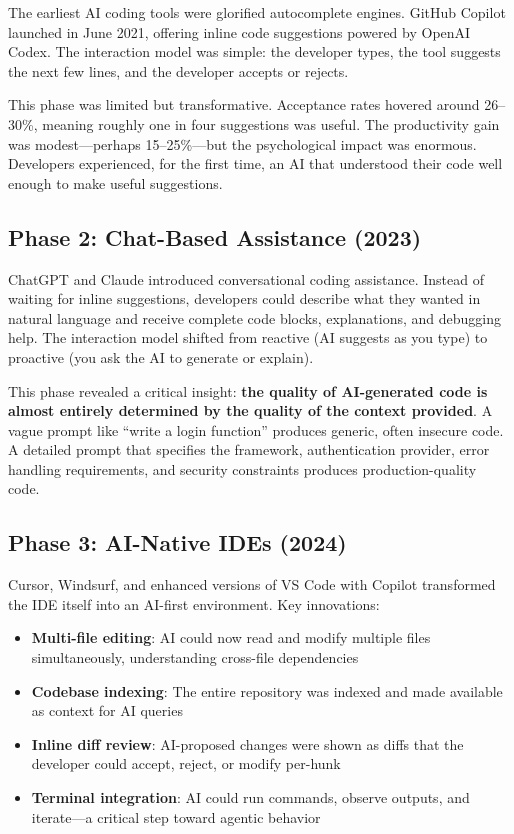 The earliest AI coding tools were glorified autocomplete engines. GitHub Copilot launched in June 2021, offering inline code suggestions powered by OpenAI Codex. The interaction model was simple: the developer types, the tool suggests the next few lines, and the developer accepts or rejects.

This phase was limited but transformative. Acceptance rates hovered around 26--30\%, meaning roughly one in four suggestions was useful. The productivity gain was modest---perhaps 15--25\%---but the psychological impact was enormous. Developers experienced, for the first time, an AI that understood their code well enough to make useful suggestions.

\subsection{Phase 2: Chat-Based Assistance (2023)}

ChatGPT and Claude introduced conversational coding assistance. Instead of waiting for inline suggestions, developers could describe what they wanted in natural language and receive complete code blocks, explanations, and debugging help. The interaction model shifted from reactive (AI suggests as you type) to proactive (you ask the AI to generate or explain).

This phase revealed a critical insight: \textbf{the quality of AI-generated code is almost entirely determined by the quality of the context provided}. A vague prompt like ``write a login function'' produces generic, often insecure code. A detailed prompt that specifies the framework, authentication provider, error handling requirements, and security constraints produces production-quality code.

\subsection{Phase 3: AI-Native IDEs (2024)}

Cursor, Windsurf, and enhanced versions of VS Code with Copilot transformed the IDE itself into an AI-first environment. Key innovations:

\begin{itemize}[leftmargin=*]
    \item \textbf{Multi-file editing}: AI could now read and modify multiple files simultaneously, understanding cross-file dependencies
    \item \textbf{Codebase indexing}: The entire repository was indexed and made available as context for AI queries
    \item \textbf{Inline diff review}: AI-proposed changes were shown as diffs that the developer could accept, reject, or modify per-hunk
    \item \textbf{Terminal integration}: AI could run commands, observe outputs, and iterate---a critical step toward agentic behavior
\end{itemize}

